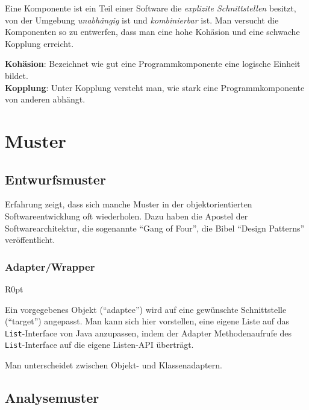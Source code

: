 \documentclass{panikzettel}
\begin{document}
Eine Komponente ist ein Teil einer Software die \emph{explizite Schnittstellen} besitzt, von der Umgebung \emph{unabhängig} ist und \emph{kombinierbar} ist.
Man versucht die Komponenten so zu entwerfen, dass man eine hohe Kohäsion und eine schwache Kopplung erreicht.

\textbf{Kohäsion}: Bezeichnet wie gut eine Programmkomponente eine logische Einheit bildet.\\
\textbf{Kopplung}: Unter Kopplung versteht man, wie stark eine Programmkomponente von anderen abhängt.

\section{Muster}
\label{sec:muster}

\subsection{Entwurfsmuster}

Erfahrung zeigt, dass sich manche Muster in der objektorientierten Softwareentwicklung oft wiederholen.
Dazu haben die Apostel der Softwarearchitektur, die sogenannte ``Gang of Four'', die Bibel ``Design Patterns'' veröffentlicht.

\subsubsection{Adapter/Wrapper}

\begin{wrapfigure}[10]{R}{0pt}
\end{wrapfigure}

Ein vorgegebenes Objekt (``adaptee'') wird auf eine gewünschte Schnittstelle (``target'') angepasst.
Man kann sich hier vorstellen, eine eigene Liste auf das \lstinline{List}-Interface von Java anzupassen, indem der Adapter Methodenaufrufe des \lstinline{List}-Interface auf die eigene Listen-API überträgt.

Man unterscheidet zwischen Objekt- und Klassenadaptern. %

\subsection{Analysemuster}
\end{document}
